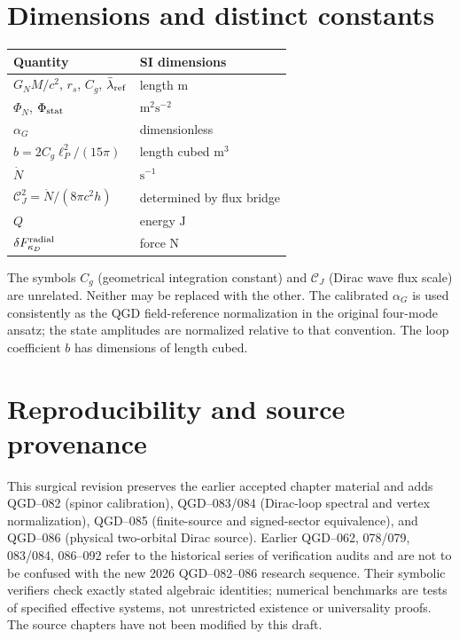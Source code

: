 \documentclass[11pt,a4paper]{article}
\theoremstyle{remark}
\begin{document}
\appendix
\section{Dimensions and distinct constants}\label{app:dimensions}
\begin{center}
\begin{tabular}{ll}
\toprule
Quantity & SI dimensions \\\midrule
$G_NM/c^2$, $r_s$, $C_g$, $\bar\lambda_{\rm ref}$ & length $\mathrm m$\\
$\Phi_N$, $\Phi_{\rm stat}$ & $\mathrm{m^2s^{-2}}$\\
$\alpha_G$ & dimensionless\\
$b=2C_g\ell_P^2/(15\pi)$ & length cubed $\mathrm m^3$\\
$\dot N$ & $\mathrm{s^{-1}}$\\
$\mathcal C_J^2=\dot N/(8\pi c^2h)$ & determined by flux bridge\\
$Q$ & energy $\mathrm J$\\
$\delta F_{\kappa_D}^{\rm radial}$ & force $\mathrm N$\\
\bottomrule
\end{tabular}
\end{center}
The symbols $C_g$ (geometrical integration constant) and $\mathcal C_J$ (Dirac wave flux scale) are unrelated. Neither may be replaced with the other. The calibrated $\alpha_G$ is used consistently as the QGD field-reference normalization in the original four-mode ansatz; the state amplitudes are normalized relative to that convention. The loop coefficient $b$ has dimensions of length cubed.

\section{Reproducibility and source provenance}\label{app:provenance}
This surgical revision preserves the earlier accepted chapter material and adds
QGD--082 (spinor calibration), QGD--083/084 (Dirac-loop spectral and vertex
normalization), QGD--085 (finite-source and signed-sector equivalence), and
QGD--086 (physical two-orbital Dirac source). Earlier QGD--062,
078/079, 083/084, 086--092 refer to the historical series of verification
audits and are not to be confused with the new 2026 QGD--082--086 research
sequence. Their symbolic verifiers check exactly stated algebraic identities; numerical benchmarks are tests of specified effective systems, not unrestricted existence or universality proofs. The source chapters have not been modified by this draft.
\end{document}
